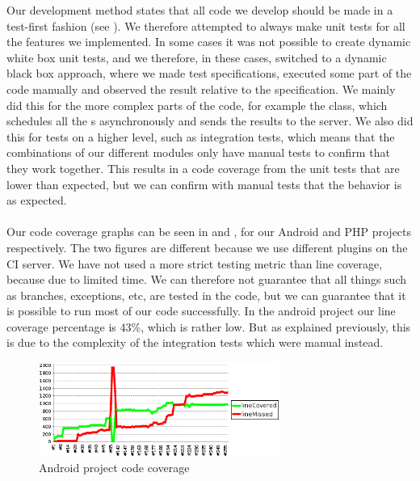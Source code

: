 Our development method states that all code we develop should be made in a test-first fashion (see ). We therefore attempted to always make unit tests for all the features we implemented. In some cases it was not possible to create dynamic white box unit tests, and we therefore, in these cases, switched to a dynamic black box approach, where we made test specifications, executed some part of the code manually and observed the result relative to the specification. We mainly did this for the more complex parts of the code, for example the  class, which schedules all the s asynchronously and sends the results to the server. We also did this for tests on a higher level, such as integration tests, which means that the combinations of our different modules only have manual tests to confirm that they work together. This results in a code coverage from the unit tests that are lower than expected, but we can confirm with manual tests that the behavior is as expected. 
\\\\
Our code coverage graphs can be seen in  and , for our Android and PHP projects respectively. The two figures are different because we use different plugins on the CI server. We have not used a more strict testing metric than line coverage, because due to limited time. We can therefore not guarantee that all things such as branches, exceptions, etc, are tested in the code, but we can guarantee that it is possible to run most of our code successfully. In the android project our line coverage percentage is 43\%, which is rather low. But as explained previously, this is due to the complexity of the integration tests which were manual instead. 


\begin{figure}[!htbp]
    \centering
    \includegraphics[width=0.7\textwidth]{graphic/quality_assurance/jenkins_android_code_coverage}
    \caption{Android project code coverage}
    \label{fig:android_project_code_coverage}
\end{figure}
\FloatBarrier

